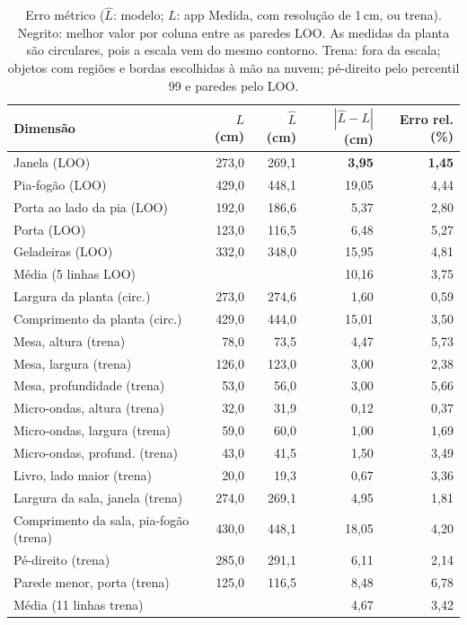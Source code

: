 \begin{table}[!htbp]
\centering
\scriptsize
\setlength{\tabcolsep}{4pt}
\caption{Erro métrico ($\hat{L}$: modelo; $L$: app Medida, com resolução de 1\,cm, ou trena). Negrito: melhor valor por coluna entre as paredes LOO. As medidas da planta são circulares, pois a escala vem do mesmo contorno. Trena: fora da escala; objetos com regiões e bordas escolhidas à mão na nuvem; pé-direito pelo percentil 99 e paredes pelo LOO.}
\label{tab:erro}
\begin{tabular}{lrrrr}
\toprule
Dimensão & $L$ (cm) & $\hat{L}$ (cm) & $|\hat{L}-L|$ (cm) & Erro rel. (\%) \\
\midrule
Janela (LOO) & 273,0 & 269,1 & \textbf{3,95} & \textbf{1,45} \\
Pia-fogão (LOO) & 429,0 & 448,1 & 19,05 & 4,44 \\
Porta ao lado da pia (LOO) & 192,0 & 186,6 & 5,37 & 2,80 \\
Porta (LOO) & 123,0 & 116,5 & 6,48 & 5,27 \\
Geladeiras (LOO) & 332,0 & 348,0 & 15,95 & 4,81 \\
\midrule
Média (5 linhas LOO) &  &  & 10,16 & 3,75 \\
\midrule
Largura da planta (circ.) & 273,0 & 274,6 & 1,60 & 0,59 \\
Comprimento da planta (circ.) & 429,0 & 444,0 & 15,01 & 3,50 \\
\midrule
Mesa, altura (trena) & 78,0 & 73,5 & 4,47 & 5,73 \\
Mesa, largura (trena) & 126,0 & 123,0 & 3,00 & 2,38 \\
Mesa, profundidade (trena) & 53,0 & 56,0 & 3,00 & 5,66 \\
Micro-ondas, altura (trena) & 32,0 & 31,9 & 0,12 & 0,37 \\
Micro-ondas, largura (trena) & 59,0 & 60,0 & 1,00 & 1,69 \\
Micro-ondas, profund. (trena) & 43,0 & 41,5 & 1,50 & 3,49 \\
Livro, lado maior (trena) & 20,0 & 19,3 & 0,67 & 3,36 \\
Largura da sala, janela (trena) & 274,0 & 269,1 & 4,95 & 1,81 \\
Comprimento da sala, pia-fogão (trena) & 430,0 & 448,1 & 18,05 & 4,20 \\
Pé-direito (trena) & 285,0 & 291,1 & 6,11 & 2,14 \\
Parede menor, porta (trena) & 125,0 & 116,5 & 8,48 & 6,78 \\
Média (11 linhas trena) &  &  & 4,67 & 3,42 \\
\bottomrule
\end{tabular}
\end{table}

